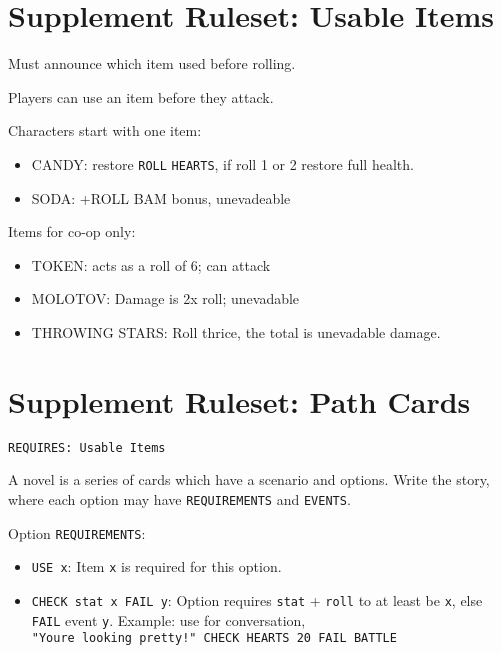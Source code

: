 \section{Supplement Ruleset: Usable
Items}\label{supplement-ruleset-usable-items}

Must announce which item used before rolling.

Players can use an item before they attack.

Characters start with one item:

\begin{itemize}
\tightlist
\item
  CANDY: restore \texttt{ROLL} \texttt{HEARTS}, if roll 1 or 2 restore
  full health.
\item
  SODA: +ROLL BAM bonus, unevadeable
\end{itemize}

Items for co-op only:

\begin{itemize}
\tightlist
\item
  TOKEN: acts as a roll of 6; can attack
\item
  MOLOTOV: Damage is 2x roll; unevadable
\item
  THROWING STARS: Roll thrice, the total is unevadable damage.
\end{itemize}

\section{Supplement Ruleset: Path
Cards}\label{supplement-ruleset-path-cards}

\texttt{REQUIRES:\ Usable\ Items}

A novel is a series of cards which have a scenario and options. Write
the story, where each option may have \texttt{REQUIREMENTS} and
\texttt{EVENTS}.

Option \texttt{REQUIREMENTS}:

\begin{itemize}
\tightlist
\item
  \texttt{USE\ x}: Item \texttt{x} is required for this option.
\item
  \texttt{CHECK\ stat\ x\ FAIL\ y}: Option requires \texttt{stat} +
  \texttt{roll} to at least be \texttt{x}, else \texttt{FAIL} event
  \texttt{y}. Example: use for conversation,
  \texttt{"You\textquotesingle{}re\ looking\ pretty!"\ CHECK\ HEARTS\ 20\ FAIL\ BATTLE}
\end{itemize}

